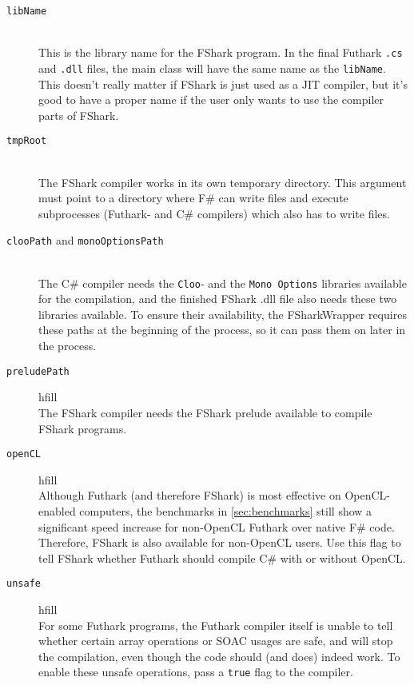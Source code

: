 \begin{description}
\item[\texttt{libName}]\hfill\\
  This is the library name for the FShark program. In the final Futhark
  \texttt{.cs} and \texttt{.dll} files, the main class will have the same name
  as the \texttt{libName}. This doesn't really matter if FShark is just used
  as a JIT compiler, but it's good to have a proper name if the user only wants
  to use the compiler parts of FShark.

\item[\texttt{tmpRoot}]\hfill\\
  The FShark compiler works in its own temporary directory. This argument must
  point to a directory where F\# can write files and execute subprocesses
  (Futhark- and C\# compilers) which also has to write files.
  
\item[\texttt{clooPath} and \texttt{monoOptionsPath}]\hfill\\
  The C\# compiler needs the \texttt{Cloo}- and the \texttt{Mono Options}
  libraries available for the compilation, and the finished FShark .dll file
  also needs these two libraries available. To ensure their availability, the
  FSharkWrapper requires these paths at the beginning of the process, so it can
  pass them on later in the process.

\item[\texttt{preludePath}]hfill\\
  The FShark compiler needs the FShark prelude available to compile FShark
  programs. 

\item[\texttt{openCL}]hfill\\
  Although Futhark (and therefore FShark) is most effective on OpenCL-enabled
  computers, the benchmarks in \ref{sec:benchmarks} still show a significant
  speed increase for non-OpenCL Futhark over native F\# code.
  Therefore, FShark is also available for non-OpenCL users. Use this flag to
  tell FShark whether Futhark should compile C\# with or without OpenCL.
  
\item[\texttt{unsafe}]hfill\\
  For some Futhark programs, the Futhark compiler itself is unable to tell
  whether certain array operations or SOAC usages are safe, and will stop the
  compilation, even though the code should (and does) indeed work.
  To enable these unsafe operations, pass a \texttt{true} flag to the compiler.
\end{description}

